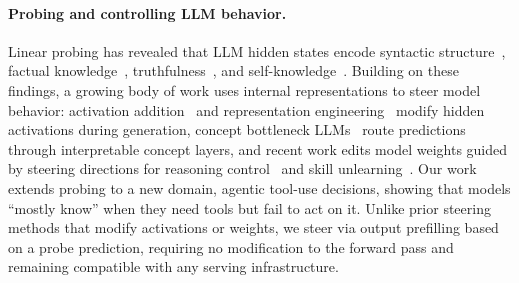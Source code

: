 \paragraph{Probing and controlling LLM behavior.}
Linear probing has revealed that LLM hidden states encode syntactic structure~\citep{hewitt2019structural}, factual knowledge~\citep{burns2022discovering}, truthfulness~\citep{li2023inference}, and self-knowledge~\citep{kadavath2022language}. Building on these findings, a growing body of work uses internal representations to steer model behavior: activation addition~\citep{turner2024activation} and representation engineering~\citep{zou2023representation} modify hidden activations during generation, concept bottleneck LLMs~\citep{sun2024concept} route predictions through interpretable concept layers, and recent work edits model weights guided by steering directions for reasoning control~\citep{sun2025thinkedit, sun2026steer2edit, yan2025reflctrl} and skill unlearning~\citep{li2025effective}. Our work extends probing to a new domain, agentic tool-use decisions, showing that models ``mostly know'' when they need tools but fail to act on it. Unlike prior steering methods that modify activations or weights, we steer via output prefilling based on a probe prediction, requiring no modification to the forward pass and remaining compatible with any serving infrastructure.
